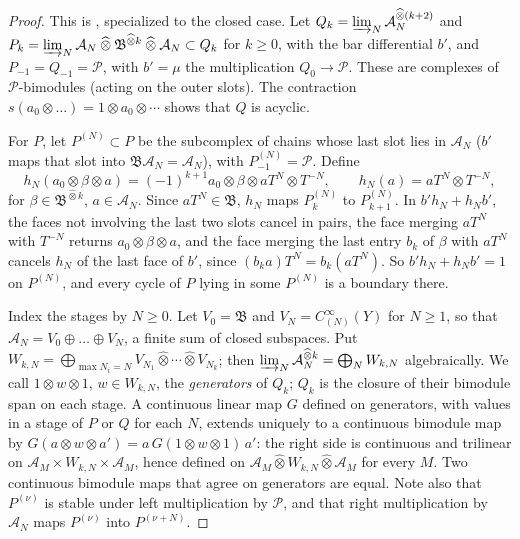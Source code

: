 \documentclass[11pt,oneside,reqno]{article}
\newcommand{\cA}{\mathcal A}
\newcommand{\cP}{\mathcal P}
\newcommand{\CI}{C^\infty}
\newcommand{\hot}{\mathbin{\widehat\otimes}}
\theoremstyle{plain}
\theoremstyle{definition}
\theoremstyle{remark}
\begin{document}
\begin{proof}
This is \cite{MN}, specialized to the closed case. Let \(Q_k=\varinjlim_N\cA_N^{\hot(k+2)}\) and
\(P_k=\varinjlim_N\cA_N\hot\mathfrak B^{\hot k}\hot\cA_N\subset Q_k\) for \(k\ge0\), with the bar differential \(b'\),
and \(P_{-1}=Q_{-1}=\cP\), with \(b'=\mu\) the multiplication \(Q_0\to\cP\). These are complexes of
\(\cP\)-bimodules (acting on the outer slots). The contraction
\(s(a_0\otimes\dots)=1\otimes a_0\otimes\cdots\) shows that \(Q\) is acyclic.

For \(P\), let \(P^{(N)}\subset P\) be the subcomplex of chains whose last slot lies in \(\cA_N\)
(\(b'\) maps that slot into \(\mathfrak B\cA_N=\cA_N\)), with \(P^{(N)}_{-1}=\cP\). Define
\[
 h_N(a_0\otimes\beta\otimes a)=(-1)^{k+1}a_0\otimes\beta\otimes aT^{N}\otimes T^{-N},\qquad h_N(a)=aT^{N}\otimes T^{-N} ,
\]
for \(\beta\in\mathfrak B^{\hot k}\), \(a\in\cA_N\). Since \(aT^{N}\in\mathfrak B\), \(h_N\) maps \(P^{(N)}_k\) to \(P^{(N)}_{k+1}\). In
\(b'h_N+h_Nb'\), the faces not involving the last two slots cancel in pairs, the face
merging \(aT^{N}\) with \(T^{-N}\) returns \(a_0\otimes\beta\otimes a\), and the face merging the last entry
\(b_k\) of \(\beta\) with \(aT^{N}\) cancels \(h_N\) of the last face of \(b'\), since
\((b_ka)T^{N}=b_k(aT^{N})\). So \(b'h_N+h_Nb'=1\) on \(P^{(N)}\), and every cycle of \(P\) lying in
some \(P^{(N)}\) is a boundary there.

Index the stages by \(N\ge0\). Let \(V_0=\mathfrak B\) and \(V_N=\CI_{(N)}(Y)\) for \(N\ge1\), so that
\(\cA_N=V_0\oplus\dots\oplus V_N\), a finite sum of closed subspaces. Put
\(W_{k,N}=\bigoplus_{\max N_i=N}V_{N_1}\hot\cdots\hot V_{N_k}\); then
\(\varinjlim_N\cA_N^{\hot k}=\bigoplus_NW_{k,N}\) algebraically. We call \(1\otimes w\otimes1\), \(w\in W_{k,N}\),
the \emph{generators} of \(Q_k\); \(Q_k\) is the closure of their bimodule span on each stage.
A continuous linear map \(G\) defined on generators, with values in a stage of \(P\) or \(Q\)
for each \(N\), extends uniquely to a continuous bimodule map by
\(G(a\otimes w\otimes a')=a\,G(1\otimes w\otimes1)\,a'\): the right side is continuous and trilinear on
\(\cA_M\times W_{k,N}\times\cA_M\), hence defined on \(\cA_M\hot W_{k,N}\hot\cA_M\) for every \(M\). Two continuous
bimodule maps that agree on generators are equal. Note also that \(P^{(\nu)}\) is stable
under left multiplication by \(\cP\), and that right multiplication by \(\cA_N\) maps
\(P^{(\nu)}\) into \(P^{(\nu+N)}\).


\end{proof}
\end{document}
